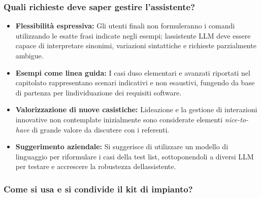 \documentclass[12pt,a4paper]{article}
\newcommand{\tightlist}{\setlength{\itemsep}{1pt}\setlength{\parskip}{0pt}}
\begin{document}
\hypertarget{quali-richieste-deve-saper-gestire-lassistente}{%
\subsubsection{\texorpdfstring{Quali richieste deve saper gestire l'assistente?}{Quali richieste deve saper gestire l'assistente?}}}

\begin{itemize}
\tightlist
\item \textbf{Flessibilità espressiva:} Gli utenti finali non formuleranno i comandi utilizzando le esatte frasi indicate negli esempi; l\textquotesingle assistente LLM deve essere capace di interpretare sinonimi, variazioni sintattiche e richieste parzialmente ambigue.
\item \textbf{Esempi come linea guida:} I casi d\textquotesingle uso elementari e avanzati riportati nel capitolato rappresentano scenari indicativi e non esaustivi, fungendo da base di partenza per l\textquotesingle individuazione dei requisiti software.
\item \textbf{Valorizzazione di nuove casistiche:} L\textquotesingle ideazione e la gestione di interazioni innovative non contemplate inizialmente sono considerate elementi \emph{nice-to-have} di grande valore da discutere con i referenti.
\item \textbf{Suggerimento aziendale:} Si suggerisce di utilizzare un modello di linguaggio per riformulare i casi della test list, sottoponendoli a diversi LLM per testare e accrescere la robustezza dell\textquotesingle assistente.
\end{itemize}

\hypertarget{come-si-usa-e-si-condivide-il-kit-di-impianto}{%
\subsubsection{\texorpdfstring{Come si usa e si condivide il kit di impianto?}{Come si usa e si condivide il kit di impianto?}}}
\end{document}
